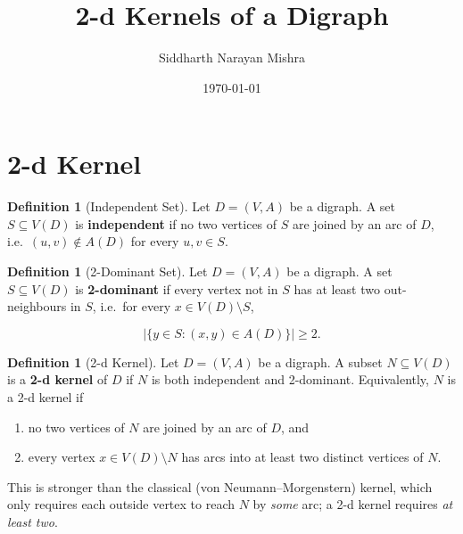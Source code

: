 \documentclass[11pt]{article}
\title{2-d Kernels of a Digraph}
\author{Siddharth Narayan Mishra}
\date{\today}
\theoremstyle{plain}
\theoremstyle{definition}
\newtheorem{definition}[theorem]{Definition}
\theoremstyle{remark}
\begin{document}
\maketitle

\section{2-d Kernel}

\begin{definition}[Independent Set]
  Let $D=(V,A)$ be a digraph. A set $S\subseteq V(D)$ is \textbf{independent} if no two vertices of $S$ are joined by an arc of $D$, i.e.\ $(u,v)\notin A(D)$ for every $u,v\in S$.
\end{definition}

\begin{definition}[2-Dominant Set]
  Let $D=(V,A)$ be a digraph. A set $S\subseteq V(D)$ is \textbf{2-dominant} if every vertex not in $S$ has at least two out-neighbours in $S$, i.e.\ for every $x\in V(D)\setminus S$,

  \[
    \left|\{y\in S: (x,y)\in A(D)\}\right|\ge 2.
  \]
\end{definition}

\begin{definition}[2-d Kernel]
  Let $D=(V,A)$ be a digraph. A subset $N\subseteq V(D)$ is a \textbf{2-d kernel} of $D$ if $N$ is both independent and 2-dominant. Equivalently, $N$ is a 2-d kernel if

  \begin{enumerate}
    \item no two vertices of $N$ are joined by an arc of $D$, and
    \item every vertex $x\in V(D)\setminus N$ has arcs into at least two distinct vertices of $N$.
  \end{enumerate}

  This is stronger than the classical (von Neumann--Morgenstern) kernel, which only requires each outside vertex to reach $N$ by \emph{some} arc; a 2-d kernel requires \emph{at least two}.
\end{definition}

\bigskip
\end{document}
